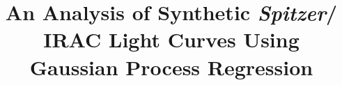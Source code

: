 \documentclass[twocolumn]{aastex61}
\begin{document}
\title{An Analysis of Synthetic \textit{Spitzer}/ IRAC Light Curves Using Gaussian Process Regression}


\end{document}
